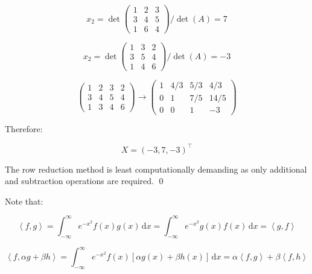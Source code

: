 \documentclass[12pt]{article}
\begin{document}
\begin{equation}
    x_{2}
    =
    \det \begin{pmatrix}
        1 & 2 & 3 \\
        3 & 4 & 5 \\
        1 & 6 & 4
    \end{pmatrix} / \det(A)
    = 7
\end{equation}

\begin{equation}
    x_{2}
    =
    \det \begin{pmatrix}
        1 & 3 & 2 \\
        3 & 5 & 4 \\
        1 & 4 & 6
    \end{pmatrix} / \det(A)
    = -3
\end{equation}


\begin{equation}
    \left( \begin{array}{ccc|c}
        1 & 2 & 3 & 2 \\
        3 & 4 & 5 & 4 \\
        1 & 3 & 4 & 6
    \end{array} \right)
    \to
    \left( \begin{array}{ccc|c}
        1 & 4/3 & 5/3 & 4/3  \\
        0 & 1   & 7/5 & 14/5 \\
        0 & 0   & 1   & -3
    \end{array} \right)
\end{equation}

Therefore:

\begin{equation}
    X = (-3 , 7, -3)^{\intercal}
\end{equation}

The row reduction method is least computationally demanding as only additional and subtraction operations are required.
\qed



Note that:

\begin{equation}
    \left\langle f, g \right\rangle = \int_{-\infty}^{\infty} e^{-x^{2}} f(x) g(x) \, \mathrm{d}x = \int_{-\infty}^{\infty} e^{-x^{2}} g(x) f(x) \, \mathrm{d}x = \left\langle g, f \right\rangle
\end{equation}

\begin{equation}
    \left\langle f, \alpha g + \beta h \right\rangle = \int_{-\infty}^{\infty} e^{-x^{2}} f(x) \left[ \alpha g(x) + \beta h(x) \right] \, \mathrm{d}x = \alpha \left\langle f, g \right\rangle + \beta \left\langle f, h \right\rangle
\end{equation}
\end{document}
